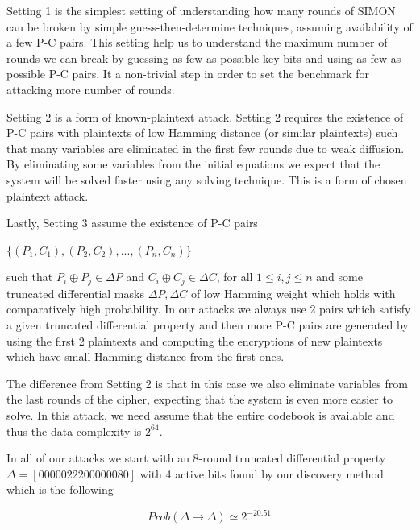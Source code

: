 
Setting 1 is the simplest setting of understanding how many rounds of SIMON
can be broken by simple guess-then-determine techniques, assuming availability of
a few P-C pairs. This setting help us to understand the maximum number of rounds we
can break by guessing as few as possible key bits and using as few as possible P-C
pairs. It a non-trivial step in order to set the benchmark for attacking more number of rounds.


Setting 2 is a form of known-plaintext attack. Setting 2 requires the existence of P-C pairs with plaintexts
of low Hamming distance (or similar plaintexts)
such that many variables are eliminated in the first few rounds due to weak
diffusion. By eliminating some variables from the initial equations we expect that
the system will be solved faster using any solving technique. This is a form of
chosen plaintext attack.

Lastly, Setting 3 assume the existence of P-C pairs

\begin{center}
	$\{(P_1,C_1),(P_2,C_2),...,(P_n,C_n)\}$
\end{center}

such that
$P_i\oplus P_j \in \Delta P$ and $C_i\oplus C_j \in \Delta C$, for
all $1\leq i,j \leq n$ and some truncated differential masks $\Delta P,\Delta C$
of low Hamming weight which holds with comparatively high probability.
In our attacks we always use 2 pairs which satisfy a given truncated
differential property and then more P-C pairs are generated by using the
first 2 plaintexts and computing the encryptions of new plaintexts which have small Hamming distance from the
first ones. 

The difference
from Setting 2 is that in this case we also eliminate variables
from the last rounds of the cipher, expecting that the system is even more easier to solve. In this
attack, we need assume that the entire codebook is available and thus the
data complexity is $2^{64}$.

In all of our attacks we start with an 8-round truncated differential property $\Delta=[00000222 00000080]$
with 4 active bits found by our discovery method which is the following

\begin{equation}
Prob(\Delta\rightarrow \Delta)\simeq2^{-20.51}
\end{equation}

